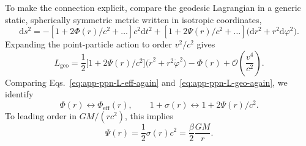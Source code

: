 \documentclass[11pt]{article}
\begin{document}
To make the connection explicit, compare the geodesic Lagrangian in a
generic static, spherically symmetric metric written in isotropic
coordinates,
\begin{equation}
  \mathrm{d}s^2
  = -\left[1 + 2\Phi(r)/c^2 + \dots\right]c^2 \mathrm{d}t^2
    + \left[1 + 2\Psi(r)/c^2 + \dots\right]
      \bigl(\mathrm{d}r^2 + r^2 \mathrm{d}\varphi^2\bigr).
\end{equation}
Expanding the point-particle action to order $v^2/c^2$ gives
\begin{equation}
  L_{\text{geo}}
  = \frac{1}{2}\bigl[1 + 2\Psi(r)/c^2\bigr]
      \bigl(\dot r^2 + r^2 \dot\varphi^2\bigr)
    - \Phi(r)
    + \mathcal{O}\!\left(\frac{v^4}{c^2}\right).
  \label{eq:app-ppn-L-geo-again}
\end{equation}
Comparing Eqs.~\eqref{eq:app-ppn-L-eff-again}
and~\eqref{eq:app-ppn-L-geo-again}, we identify
\begin{equation}
  \Phi(r) \leftrightarrow \Phi_{\mathrm{eff}}(r),
  \qquad
  1 + \sigma(r) \leftrightarrow 1 + 2\Psi(r)/c^2.
\end{equation}
To leading order in $GM/(r c^2)$, this implies
\begin{equation}
  \Psi(r)
  = \frac{1}{2}\sigma(r) c^2
  = \frac{\beta}{2}\frac{GM}{r}.
\end{equation}
\end{document}
